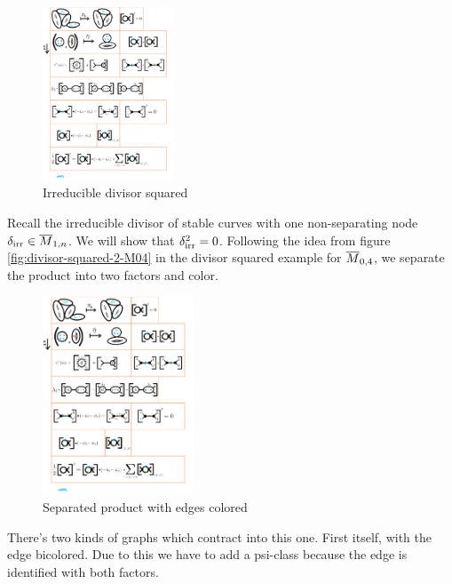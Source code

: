 \documentclass[12pt]{memoir}
\begin{document}
\begin{Ex}\label{ex-unexpectedly-zero-square}
\begin{figure}[h!]
        \centering
        \includegraphics[width=0.35\textwidth, trim= 12.8cm 25.5cm 5.2cm 0.5cm,clip]{../figs/FigsDNnotability2.pdf}
        \caption{Irreducible divisor squared}
        \label{fig:irr-squared-1}
    \end{figure}

   Recall the irreducible divisor of stable curves with one non-separating node $\delta_{\text{irr}}\in\overline{M}_{1,n}$. We will show that $\delta_{\text{irr}}^2=0$. Following the idea from figure \ref{fig:divisor-squared-2-M04} in the divisor squared example for $\overline{M}_{0,4}$, we separate the product into two factors and color.

   \begin{figure}[h!]
        \centering
        \includegraphics[width=0.4\textwidth, trim= 14.1cm 21.3cm 2.7cm 4.3cm,clip]{../figs/FigsDNnotability2.pdf}
        \caption{Separated product with edges colored}
        \label{fig:irr-squared-2}
    \end{figure}

    There's two kinds of graphs which contract into this one. First itself, with the edge bicolored. Due to this we have to add a psi-class because the edge is identified with both factors.


\end{Ex}
\end{document}
